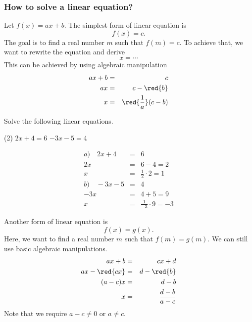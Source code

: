 \begin{frame}
\frametitle{How to solve a linear equation?}
Let $f(x) = ax + b$. The simplest form of linear equation is
\[ f(x) = c.\]
The goal is to find a real number $m$ such that $f(m) = c$. To achieve that, we want to rewrite the equation and derive
\[ x = \cdots\]
This can be achieved by using algebraic manipulation
\begin{eqnarray*}
ax + b &=& c \\
ax &=& c - \red{b}\\
x &=& \red{\frac{1}{a}}(c-b)
\end{eqnarray*}
\end{frame}

\begin{frame}[t]
\begin{ex}
Solve the following linear equations.
\begin{tasks}(2)
\task $2x+4=6$
\task $-3x-5=4$
\end{tasks}
\end{ex}
\begin{sol}

\begin{eqnarray*}
a) \quad 2x + 4 &=& 6 \\
2x &=& 6-4 = 2 \\
x &=& \frac{1}{2}\cdot  2 = 1 \\
b) \quad -3x -5 &=& 4 \\
-3x &=& 4+5 = 9 \\
x &=& \frac{1}{-3} \cdot 9 = -3
\end{eqnarray*}
\end{sol}
\end{frame}

\begin{frame}
Another form of linear equation is
\[ f(x) = g(x).\]
Here, we want to find a real number $m$ such that $f(m) = g(m)$. We can still use basic algebraic manipulations.
\begin{eqnarray*}
ax + b &=& cx + d \\ 
ax - \red{cx} &=& d - \red{b} \\
(a-c)x &=& d-b \\
x &=& \frac{d-b}{a-c}
\end{eqnarray*}
Note that we require $a-c\neq0$ or $a \neq c$. 
\end{frame}

